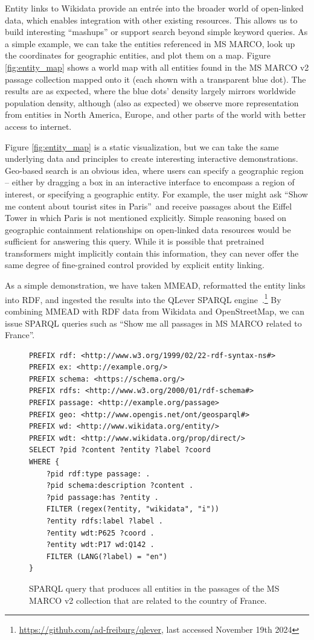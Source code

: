 Entity links to Wikidata provide an entr\'ee into the broader world of open-linked data, which enables integration with other existing resources.
This allows us to build interesting ``mashups'' or support search beyond simple keyword queries.
As a simple example, we can take the entities referenced in MS MARCO, look up the coordinates for geographic entities, and plot them on a map. 
Figure \ref{fig:entity_map} shows a world map with all entities found in the MS MARCO v2 passage collection mapped onto it (each shown with a transparent blue dot).
The results are as expected, where the blue dots' density largely mirrors worldwide population density, although (also as expected) we observe more representation from entities in North America, Europe, and other parts of the world with better access to internet.

Figure \ref{fig:entity_map} is a static visualization, but we can take the same underlying data and principles to create interesting interactive demonstrations.
Geo-based search is an obvious idea, where users can specify a geographic region -- either by dragging a box in an interactive interface to encompass a region of interest, or specifying a geographic entity.
For example, the user might ask ``Show me content about tourist sites in Paris''\ and receive passages about the Eiffel Tower in which Paris is not mentioned explicitly.
Simple reasoning based on geographic containment relationships on open-linked data resources would be sufficient for answering this query.
While it is possible that pretrained transformers might implicitly contain this information, they can never offer the same degree of fine-grained control provided by explicit entity linking.

As a simple demonstration, we have taken MMEAD, reformatted the entity links into RDF, and ingested the results into the QLever SPARQL engine~\citep{qlever}.\footnote{\url{https://github.com/ad-freiburg/qlever}, last accessed November 19th 2024}
By combining MMEAD with RDF data from Wikidata and OpenStreetMap, we can issue SPARQL queries such as ``Show me all passages in MS MARCO related to France''.

\begin{figure}
	\centering
	\begin{verbatim}
PREFIX rdf: <http://www.w3.org/1999/02/22-rdf-syntax-ns#>
PREFIX ex: <http://example.org/> 
PREFIX schema: <https://schema.org/>
PREFIX rdfs: <http://www.w3.org/2000/01/rdf-schema#>
PREFIX passage: <http://example.org/passage> 
PREFIX geo: <http://www.opengis.net/ont/geosparql#>
PREFIX wd: <http://www.wikidata.org/entity/>
PREFIX wdt: <http://www.wikidata.org/prop/direct/>
SELECT ?pid ?content ?entity ?label ?coord 
WHERE {
	?pid rdf:type passage: .
	?pid schema:description ?content .
	?pid passage:has ?entity .
	FILTER (regex(?entity, "wikidata", "i"))
	?entity rdfs:label ?label .
	?entity wdt:P625 ?coord .
	?entity wdt:P17 wd:Q142 .
	FILTER (LANG(?label) = "en")
}
	\end{verbatim}
	\caption{SPARQL query that produces all entities in the passages of the MS MARCO v2 collection that are related to the country of France.}
	\label{fig:code_sparql}
\end{figure}

